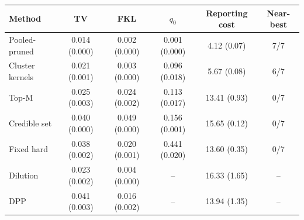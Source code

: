 \begin{tabular}{lccccc}
\toprule
Method & TV & FKL & $q_0$ & Reporting cost & Near-best \\
\midrule
Pooled-pruned & 0.014 (0.000) & 0.002 (0.000) & 0.001 (0.000) & 4.12 (0.07) & 7/7
\\
Cluster kernels & 0.021 (0.001) & 0.003 (0.000) & 0.096 (0.018) & 5.67 (0.08) & 6/7
\\
Top-M & 0.025 (0.003) & 0.024 (0.002) & 0.113 (0.017) & 13.41 (0.93) & 0/7
\\
Credible set & 0.040 (0.000) & 0.049 (0.000) & 0.156 (0.001) & 15.65 (0.12) & 0/7
\\
Fixed hard & 0.038 (0.002) & 0.020 (0.001) & 0.441 (0.020) & 13.60 (0.35) & 0/7
\\
Dilution & 0.023 (0.002) & 0.004 (0.000) & -- & 16.33 (1.65) & --
\\
DPP & 0.041 (0.003) & 0.016 (0.002) & -- & 13.94 (1.35) & --
\\
\bottomrule
\end{tabular}
